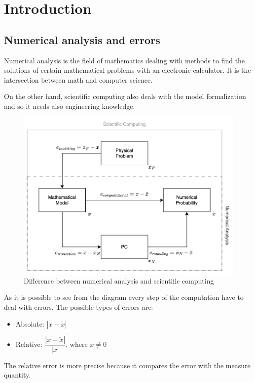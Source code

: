 \documentclass[12pt, a4paper]{report}
\newtheorem[style=M,bodystyle=\normalfont]{theorem}{Theorem}
\newtheorem[style=M,bodystyle=\normalfont]{corollary}{Corollary}
\newtheorem[style=M,bodystyle=\normalfont]{lemma}{Lemma}
\newtheorem[style=M,bodystyle=\normalfont]{definition}{Definition}
\begin{document}
\newpage

\tableofcontents

\newpage

\chapter{Introduction}
\section{Numerical analysis and errors}
Numerical analysis is the field of mathematics dealing with methods to find the solutions of certain mathematical problems with an electronic 
calculator. It is the intersection between math and computer science. 

On the other hand, scientific computing also deals with the model formalization and so it needs also engineering knowledge. 
\begin{figure}[H]
    \centering
    \includegraphics[width=0.75\linewidth]{images/difference.png}
    \caption{Difference between numerical analysis and scientific computing}
\end{figure}
As it is possible to see from the diagram every step of the computation have to deal with errors. The possible types of errors are: 
\begin{itemize}
    \item Absolute: $\left\lvert x - \tilde{x} \right\rvert$
    \item Relative: $\dfrac{\left\lvert x - \tilde{x} \right\rvert}{\left\lvert x \right\rvert}$, where $x \neq 0$
\end{itemize}
The relative error is more precise because it compares the error with the measure quantity. 
\end{document}
